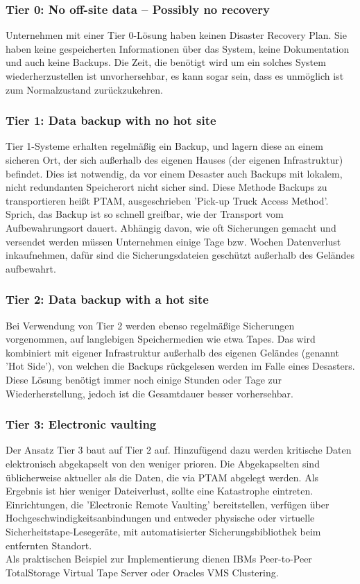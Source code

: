 \documentclass[letterpaper, 12pt]{article}
\let\tempsubsubsection\subsubsection
\renewcommand\subsubsection[1]{\vspace{0cm}\tempsubsubsection{#1}\vspace{0cm}}
\begin{document}
	\subsubsection{Tier 0: No off-site data – Possibly no recovery}
	Unternehmen mit einer Tier 0-Lösung haben keinen Disaster Recovery Plan. Sie haben keine gespeicherten Informationen über das System, keine Dokumentation und auch keine Backups. Die Zeit, die benötigt wird um ein solches System wiederherzustellen ist unvorhersehbar, es kann sogar sein, dass es unmöglich ist zum Normalzustand zurückzukehren.
	\subsubsection{Tier 1: Data backup with no hot site}
	Tier 1-Systeme erhalten regelmäßig ein Backup, und lagern diese an einem sicheren Ort, der sich außerhalb des eigenen Hauses (der eigenen Infrastruktur) befindet. Dies ist notwendig, da vor einem Desaster auch Backups mit lokalem, nicht redundanten Speicherort nicht sicher sind. Diese Methode Backups zu transportieren heißt PTAM, ausgeschrieben 'Pick-up Truck Access Method'. Sprich, das Backup ist so schnell greifbar, wie der Transport vom Aufbewahrungsort dauert. Abhängig davon, wie oft Sicherungen gemacht und versendet werden müssen Unternehmen einige Tage bzw. Wochen Datenverlust inkaufnehmen, dafür sind die Sicherungsdateien geschützt außerhalb des Geländes aufbewahrt.
	\subsubsection{Tier 2: Data backup with a hot site}
	Bei Verwendung von Tier 2 werden ebenso regelmäßige Sicherungen vorgenommen, auf langlebigen Speichermedien wie etwa Tapes. Das wird kombiniert mit eigener Infrastruktur außerhalb des eigenen Geländes (genannt 'Hot Side'), von welchen die Backups rückgelesen werden im Falle eines Desasters. Diese Lösung benötigt immer noch einige Stunden oder Tage zur Wiederherstellung, jedoch ist die Gesamtdauer besser vorhersehbar.
	\subsubsection{Tier 3: Electronic vaulting}
	Der Ansatz Tier 3 baut auf Tier 2 auf. Hinzufügend dazu werden kritische Daten elektronisch abgekapselt von den weniger prioren. Die Abgekapselten sind üblicherweise aktueller als die Daten, die via PTAM abgelegt werden. Als Ergebnis ist hier weniger Dateiverlust, sollte eine Katastrophe eintreten. \\ Einrichtungen, die 'Electronic Remote Vaulting' bereitstellen, verfügen über Hochgeschwindigkeitsanbindungen und entweder physische oder virtuelle Sicherheitstape-Lesegeräte, mit automatisierter Sicherungsbibliothek beim entfernten Standort. \\ Als praktischen Beispiel zur Implementierung dienen IBMs Peer-to-Peer TotalStorage Virtual Tape Server oder Oracles VMS Clustering.
\end{document}
